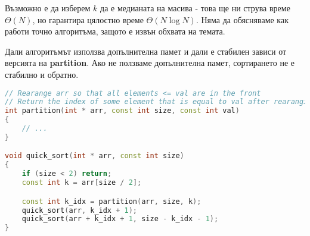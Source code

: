 \documentclass[fleqn,12pt]{article}
\begin{document}
Възможно е да изберем $k$ да е медианата на масива - това ще ни струва време $\Theta(N)$, но гарантира цялостно време $\Theta(N \log N)$.
Няма да обясняваме как работи точно алгоритъма, защото е извън обхвата на темата.

Дали алгоритъмът използва допълнителна памет и дали е стабилен зависи от версията на \textbf{partition}. Ако не ползваме допълнителна памет,
сортирането не е стабилно и обратно.

\begin{lstlisting}[language=C++, caption=QuickSort]
// Rearange arr so that all elements <= val are in the front
// Return the index of some element that is equal to val after rearanging
int partition(int * arr, const int size, const int val)
{
    // ...
}

void quick_sort(int * arr, const int size)
{
    if (size < 2) return;
    const int k = arr[size / 2];

    const int k_idx = partition(arr, size, k);
    quick_sort(arr, k_idx + 1);
    quick_sort(arr + k_idx + 1, size - k_idx - 1);
}
\end{lstlisting}
\end{document}
